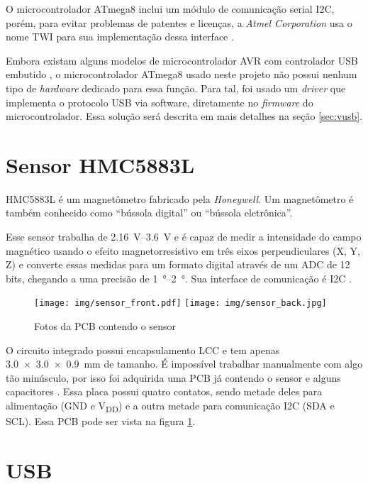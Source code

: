 \documentclass[brazil,pagestart=firstchapter]{abnt}
\newcommand*{\VDD}{V\textsubscript{DD}\xspace}
\newcommand*{\GND}{GND\xspace}
\begin{document}
O microcontrolador ATmega8 inclui um módulo de comunicação serial \ac{I2C},
porém, para evitar problemas de patentes e licenças, a \textit{Atmel
Corporation} usa o nome \ac{TWI} para sua implementação dessa interface
\cite{avrlibctwi}.

Embora existam alguns modelos de microcontrolador AVR com controlador
\acs{USB} embutido \cite{atmel_avr_product_list}, o microcontrolador ATmega8
usado neste projeto não possui nenhum tipo de \textit{hardware} dedicado
para essa função. Para tal, foi usado um \textit{driver} que implementa o
protocolo \acs{USB} via software, diretamente no \textit{firmware} do
microcontrolador. Essa solução será descrita em mais detalhes na seção
\ref{sec:vusb}.


\section{Sensor HMC5883L}
\label{sec:sensor}

HMC5883L é um magnetômetro fabricado pela \textit{Honeywell}. Um
magnetômetro é também conhecido como ``bússola digital'' ou ``bússola
eletrônica''.

Esse sensor trabalha de \SIrange{2.16}{3.6}{\volt} e é capaz de medir a
intensidade do campo magnético usando o efeito magnetorresistivo em três
eixos perpendiculares (X, Y, Z) e converte essas medidas para um formato
digital através de um \ac{ADC} de 12 bits, chegando a uma precisão de
\SIrange{1}{2}{\degree}. Sua interface de comunicação é \ac{I2C}
\cite{HMC5883L}.

\begin{figure}[h]
\centering
\texttt{[image: img/sensor\_front.pdf]}
\texttt{[image: img/sensor\_back.jpg]}
\caption{Fotos da PCB contendo o sensor}
\label{fig:sensor_photos}
\end{figure}

O circuito integrado possui encapsulamento \ac{LCC} e tem apenas
\SI[product-units=single]{3.0 x 3.0 x 0.9}{\milli\metre} de tamanho. É
impossível trabalhar manualmente com algo tão minúsculo, por isso foi
adquirida uma \ac{PCB} já contendo o sensor e alguns capacitores
\cite{ebay_HMC5883L}. Essa placa possui quatro contatos, sendo metade deles
para alimentação (\GND e \VDD) e a outra metade para comunicação \ac{I2C}
(SDA e SCL). Essa \ac{PCB} pode ser vista na figura \ref{fig:sensor_photos}.


\section{USB}
\label{sec:usb}
\end{document}
